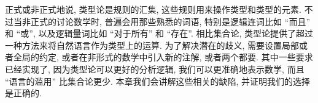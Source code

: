 正式或非正式地说, 类型论是规则的汇集, 这些规则用来操作类型和类型的元素.
不过当非正式的讨论数学时, 普遍会用那些熟悉的词语, 特别是逻辑连词比如 ``而且'' 和 ``或'', 以及逻辑量词比如 ``对于所有'' 和 ``存在''.
相比集合论, 类型论提供了超过一种方法来将自然语言作为类型上的运算.
为了解决潜在的歧义, 需要设置局部或者全局的约定, 或者在非形式的数学中引入新的注解, 或者两个都要.
其中一些要求已经实现了, 因为类型论可以更好的分析逻辑, 我们可以更准确地表示数学, 而且 ``语言的滥用'' 比集合论更少.
本章我们会讲解这些相关的缺陷, 并证明我们的选择是正确的.
